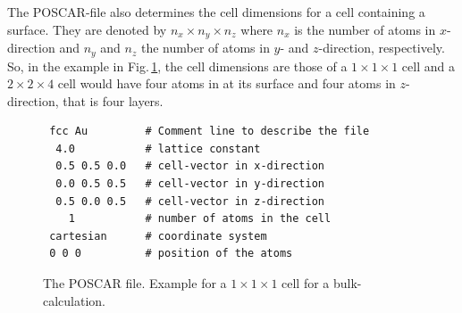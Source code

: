 \documentclass[twoside, 11pt, titlepage, captions=nooneline, a4paper, headsepline]{scrbook}%
\newcommand{\9}{\mathrm}
\newcommand{\0}{\,\mathrm}
\begin{document}
The POSCAR-file also determines the cell dimensions for a cell containing a surface. They are denoted by $n_x\times n_y\times n_z$ where $n_x$ is the number of atoms in $x$-direction and $n_y$ and $n_z$ the number of atoms in $y$- and $z$-direction, respectively. So, in the example in Fig.\,\ref{POSCARfile}, the cell dimensions are those of a $1\times1\times1$ cell and a $2\times2\times4$ cell would have four atoms in at its surface and four atoms in $z$-direction, that is four layers.
\begin{figure}[t!]
\begin{verbatim}
 fcc Au         # Comment line to describe the file
  4.0           # lattice constant
  0.5 0.5 0.0   # cell-vector in x-direction
  0.0 0.5 0.5   # cell-vector in y-direction 
  0.5 0.0 0.5   # cell-vector in z-direction
    1           # number of atoms in the cell
 cartesian      # coordinate system 
 0 0 0          # position of the atoms
\end{verbatim}
\caption{\label{POSCARfile}The POSCAR file. Example for a $1\times1\times1$ cell for a bulk-calculation.}
\end{figure}
\end{document}
